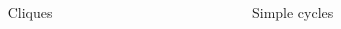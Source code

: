 \begin{minipage}[t]{\textwidth}
    \begin{columns}
        \begin{column}{0.5\textwidth}
            \begin{columns}
                \begin{column}{0.6\textwidth}
                    \begin{flushright}
                        \resizebox{0.9\textwidth}{!}{}
                    \end{flushright}
                \end{column}
                \begin{column}{0.4\textwidth}
                    Cliques
                \end{column}
            \end{columns}
        \end{column}
        \hfill
        \begin{column}{0.5\textwidth}
            \begin{columns}
                \begin{column}{0.6\textwidth}
                    \begin{flushright}
                        \resizebox{0.9\textwidth}{!}{}
                    \end{flushright}
                \end{column}
                \begin{column}{0.4\textwidth}
                    Simple cycles
                \end{column}
            \end{columns}
        \end{column}
    \end{columns}
\end{minipage}